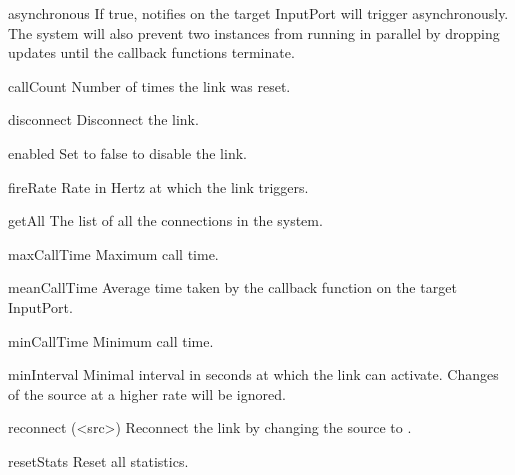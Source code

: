 \begin{urbiscriptapi}
\item[asynchronous]%
  If true, notifies on the target InputPort will trigger asynchronously. The
  system will also prevent two instances from running in parallel by
  dropping updates until the callback functions terminate.


\item[callCount]
  Number of times the link was reset.


\item[disconnect]
  Disconnect the link.


\item[enabled]
  Set to false to disable the link.


\item[fireRate]
  Rate in Hertz at which the link triggers.


\item[getAll]
  The list of all the connections in the system.


\item[maxCallTime]
  Maximum call time.


\item[meanCallTime]
  Average time taken by the callback function on the target InputPort.


\item[minCallTime]
  Minimum call time.


\item[minInterval]
  Minimal interval in seconds at which the link can activate. Changes of the
  source at a higher rate will be ignored.


\item[reconnect](<src>)
  Reconnect the link by changing the source to .


\item[resetStats]
  Reset all statistics.
\end{urbiscriptapi}



